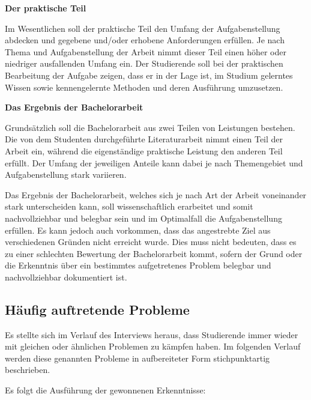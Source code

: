 \documentclass[bibliography=totoc,listof=totoc,BCOR=5mm,DIV=12,oneside]{scrbook}
\begin{document}
\newpage
\par \bigskip \textbf{Der praktische Teil}
\par Im Wesentlichen soll der praktische Teil den Umfang der Aufgabenstellung abdecken und gegebene und/oder erhobene Anforderungen erfüllen. Je nach Thema und Aufgabenstellung der Arbeit nimmt dieser Teil einen höher oder niedriger ausfallenden Umfang ein.
Der Studierende soll bei der praktischen Bearbeitung der Aufgabe zeigen, dass er in der Lage ist, im Studium gelerntes Wissen sowie kennengelernte Methoden und deren Ausführung umzusetzen. 
\par \bigskip \textbf{Das Ergebnis der Bachelorarbeit}
\par Grundsätzlich soll die Bachelorarbeit aus zwei Teilen von Leistungen bestehen. Die von dem Studenten durchgeführte Literaturarbeit nimmt einen Teil der Arbeit ein, während die eigenständige praktische Leistung den anderen Teil erfüllt. Der Umfang der jeweiligen Anteile kann dabei je nach Themengebiet und Aufgabenstellung stark variieren.
\par Das Ergebnis der Bachelorarbeit, welches sich je nach Art der Arbeit voneinander stark unterscheiden kann, soll wissenschaftlich erarbeitet und somit nachvollziehbar und belegbar sein und im Optimalfall die Aufgabenstellung erfüllen. Es kann jedoch auch vorkommen, dass das angestrebte Ziel aus verschiedenen Gründen nicht erreicht wurde. Dies muss nicht bedeuten, dass es zu einer schlechten Bewertung der Bachelorarbeit kommt, sofern der Grund oder die Erkenntnis über ein bestimmtes aufgetretenes Problem belegbar und nachvollziehbar dokumentiert ist.

\newpage
\subsection{Häufig auftretende Probleme}
\par Es stellte sich im Verlauf des Interviews heraus, dass Studierende immer wieder mit gleichen oder ähnlichen Problemen zu kämpfen haben. Im folgenden Verlauf werden diese genannten Probleme in aufbereiteter Form stichpunktartig beschrieben.

\par \medskip Es folgt die Ausführung der gewonnenen Erkenntnisse:
\end{document}
